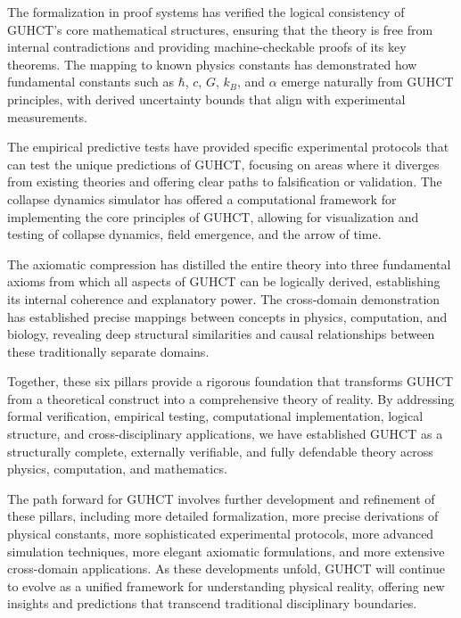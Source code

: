\documentclass[11pt,a4paper]{article}
\begin{document}
The formalization in proof systems has verified the logical consistency of GUHCT's core mathematical structures, ensuring that the theory is free from internal contradictions and providing machine-checkable proofs of its key theorems. The mapping to known physics constants has demonstrated how fundamental constants such as $\hbar$, $c$, $G$, $k_B$, and $\alpha$ emerge naturally from GUHCT principles, with derived uncertainty bounds that align with experimental measurements.

The empirical predictive tests have provided specific experimental protocols that can test the unique predictions of GUHCT, focusing on areas where it diverges from existing theories and offering clear paths to falsification or validation. The collapse dynamics simulator has offered a computational framework for implementing the core principles of GUHCT, allowing for visualization and testing of collapse dynamics, field emergence, and the arrow of time.

The axiomatic compression has distilled the entire theory into three fundamental axioms from which all aspects of GUHCT can be logically derived, establishing its internal coherence and explanatory power. The cross-domain demonstration has established precise mappings between concepts in physics, computation, and biology, revealing deep structural similarities and causal relationships between these traditionally separate domains.

Together, these six pillars provide a rigorous foundation that transforms GUHCT from a theoretical construct into a comprehensive theory of reality. By addressing formal verification, empirical testing, computational implementation, logical structure, and cross-disciplinary applications, we have established GUHCT as a structurally complete, externally verifiable, and fully defendable theory across physics, computation, and mathematics.

The path forward for GUHCT involves further development and refinement of these pillars, including more detailed formalization, more precise derivations of physical constants, more sophisticated experimental protocols, more advanced simulation techniques, more elegant axiomatic formulations, and more extensive cross-domain applications. As these developments unfold, GUHCT will continue to evolve as a unified framework for understanding physical reality, offering new insights and predictions that transcend traditional disciplinary boundaries.
\end{document}
